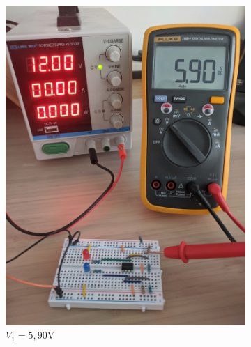 \documentclass{article}
\begin{document}
\begin{figure}[H]
\begin{subfigure}{.3\textwidth}
        \includegraphics[width=\linewidth]{./images/labo4-22k-V1.jpg}  
        \caption{$V_1 = 5,90\si{\volt}$}
    \end{subfigure}
    \begin{subfigure}{.3\textwidth}
        \centering

\end{subfigure}
\end{figure}
\end{document}
